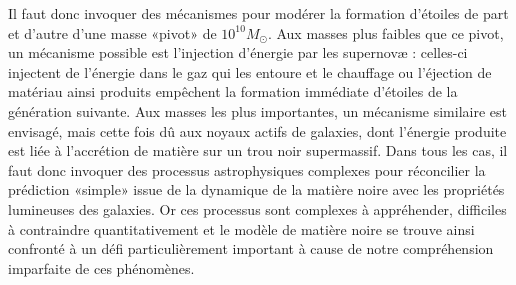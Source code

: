 Il faut donc invoquer des mécanismes pour modérer la formation d'étoiles de part et d'autre d'une masse «pivot» de $10^{10} M_\odot$. Aux masses plus faibles que ce pivot, un mécanisme possible est l'injection d'énergie par les supernovæ : celles-ci injectent de l'énergie dans le gaz qui les entoure et le chauffage ou l'éjection de matériau ainsi produits empêchent la formation immédiate d'étoiles de la génération suivante. Aux masses les plus importantes, un mécanisme similaire est envisagé, mais cette fois dû aux noyaux actifs de galaxies, dont l'énergie produite est liée à l'accrétion de matière sur un trou noir supermassif. Dans tous les cas, il faut donc invoquer des processus astrophysiques complexes pour réconcilier la prédiction «simple» issue de la dynamique de la matière noire avec les propriétés lumineuses des galaxies. Or ces processus sont complexes à appréhender, difficiles à contraindre quantitativement et le modèle de matière noire se trouve ainsi confronté à un défi particulièrement important à cause de notre compréhension imparfaite de ces phénomènes.

